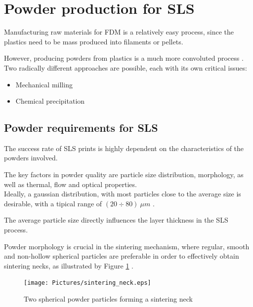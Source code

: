 \documentclass[a4paper]{article}
\begin{document}
    \section{Powder production for SLS \label{Powder_production}}

    Manufacturing raw materials for FDM is a relatively easy process, since the plastics need to be mass produced into filaments or pellets.

    However, producing powders from plastics is a much more convoluted process \autocites{doi:10.1063/1.4918516,Dechet_Schmidt_thermal_rounding,Recent_progress_polymers_AM}. \\ 

    Two radically different approaches are possible, each with its own critical issues: 

    \begin{itemize}
        \item Mechanical milling
        \item Chemical precipitation
    \end{itemize} 

    \subsection{Powder requirements for SLS \label{Powder_requirements}}

    The success rate of SLS prints is highly dependent on the characteristics of the powders involved. 

    The key factors in powder quality are particle size distribution, morphology, as well as thermal, flow and optical properties. \\
    
    Ideally, a gaussian distribution, with most particles close to the average size is desirable, 
    with a tipical range of $(20 \div 80) \ \mu m$ \autocite*{doi:10.1063/1.4918516}. 

    The average particle size directly influences the layer thickness in the SLS process.  
    
    Powder morphology is crucial in the sintering mechanism, where regular, smooth and non-hollow spherical 
    particles are preferable in order to effectively obtain sintering necks, as illustrated by Figure \ref{fig:SLS_sintering_neck} \autocite*{doi:10.1063/1.4918516}.  

    \begin{figure}[ht]
        \centering
        \texttt{[image: Pictures/sintering\_neck.eps]}\\
        \caption{Two spherical powder particles forming a sintering neck} 
        \label{fig:SLS_sintering_neck}
    \end{figure}
\end{document}
